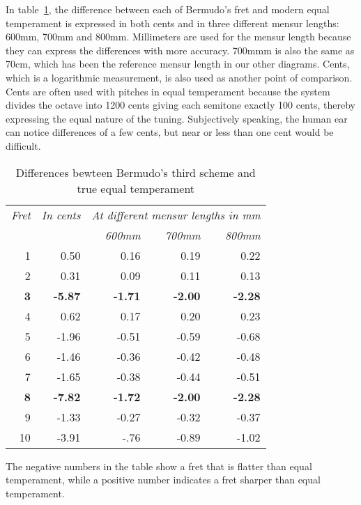 In table~\ref{bermudo:differences}, the difference between each of Bermudo's fret and
modern equal temperament is expressed in both cents and in three different mensur
lengths: 600mm, 700mm and 800mm.  Millimeters are used for the mensur length because they
can express the differences with more accuracy.  700mmm is also the same as 70cm, which
has been the reference mensur length in our other diagrams. Cents, which is a logarithmic
measurement, is also used as another point of comparison.  Cents are often used with
pitches in equal temperament because the system divides the octave into 1200 cents giving
each semitone exactly 100 cents, thereby expressing the equal nature of the tuning.
Subjectively speaking, the human ear can notice differences of a few cents, but near or
less than one cent would be difficult.
\begin{table}[h!]
    \begin{center}
    \begin{tabular}{ r r| r r r }
      \textit{Fret} & \textit{In cents} & \multicolumn{3}{c}{\textit{At different mensur lengths in mm}} \\
       &  & \textit{600mm} & \textit{700mm} & \textit{800mm} \\
      \hline
              1  &          0.50	&          0.16	 &          0.19  &          0.22  \\
              2  &          0.31	&          0.09	 &          0.11  &          0.13  \\
      \textbf{3} & \textbf{-5.87}	& \textbf{-1.71} & \textbf{-2.00} & \textbf{-2.28} \\
              4  &          0.62	&          0.17	 &          0.20  &          0.23  \\
              5  &         -1.96	&         -0.51	 &         -0.59  &         -0.68  \\
              6  &         -1.46	&         -0.36	 &         -0.42  &         -0.48  \\
              7  &         -1.65	&         -0.38	 &         -0.44  &         -0.51  \\
      \textbf{8} & \textbf{-7.82}	& \textbf{-1.72} & \textbf{-2.00} & \textbf{-2.28} \\
              9  &         -1.33	&         -0.27	 &         -0.32  &         -0.37  \\
              10 &         -3.91	&         -.76	 &         -0.89  &         -1.02  \\
    \end{tabular}
    \end{center}
    \caption{Differences bewteen Bermudo's third scheme and true equal temperament}
    \label{bermudo:differences}
\end{table}
The negative numbers in the table show a fret that is flatter than equal temperament,
while a positive number indicates a fret sharper than equal temperament.

